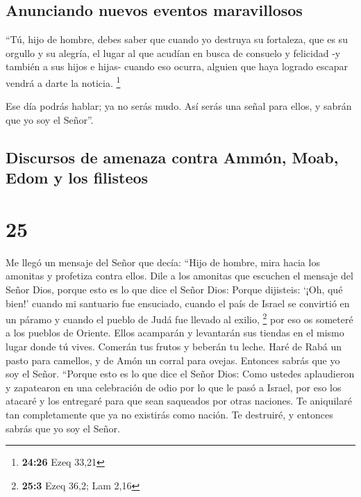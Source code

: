 \hypertarget{anunciando-nuevos-eventos-maravillosos}{%
\subsection{Anunciando nuevos eventos
maravillosos}\label{anunciando-nuevos-eventos-maravillosos}}

 ``Tú, hijo de hombre, debes saber que cuando yo destruya
su fortaleza, que es su orgullo y su alegría, el lugar al que acudían en
busca de consuelo y felicidad -y también a sus hijos e hijas-
 cuando eso ocurra, alguien que haya logrado escapar
vendrá a darte la noticia. \footnote{\textbf{24:26} Ezeq 33,21}

 Ese día podrás hablar; ya no serás mudo. Así serás una
señal para ellos, y sabrán que yo soy el Señor''.

\hypertarget{discursos-de-amenaza-contra-ammuxf3n-moab-edom-y-los-filisteos}{%
\subsection{Discursos de amenaza contra Ammón, Moab, Edom y los
filisteos}\label{discursos-de-amenaza-contra-ammuxf3n-moab-edom-y-los-filisteos}}

\hypertarget{section-24}{%
\section{25}\label{section-24}}

 Me llegó un mensaje del Señor que decía: 
``Hijo de hombre, mira hacia los amonitas y profetiza contra ellos.
 Dile a los amonitas que escuchen el mensaje del Señor
Dios, porque esto es lo que dice el Señor Dios: Porque dijisteis: `¡Oh,
qué bien!' cuando mi santuario fue ensuciado, cuando el país de Israel
se convirtió en un páramo y cuando el pueblo de Judá fue llevado al
exilio, \footnote{\textbf{25:3} Ezeq 36,2; Lam 2,16}  por
eso os someteré a los pueblos de Oriente. Ellos acamparán y levantarán
sus tiendas en el mismo lugar donde tú vives. Comerán tus frutos y
beberán tu leche.  Haré de Rabá un pasto para camellos, y
de Amón un corral para ovejas. Entonces sabrás que yo soy el Señor.
 ``Porque esto es lo que dice el Señor Dios: Como ustedes
aplaudieron y zapatearon en una celebración de odio por lo que le pasó a
Israel,  por eso los atacaré y los entregaré para que sean
saqueados por otras naciones. Te aniquilaré tan completamente que ya no
existirás como nación. Te destruiré, y entonces sabrás que yo soy el
Señor.

